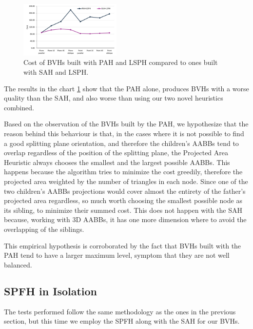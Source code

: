 \documentclass[acmtog, anonymous, review]{acmart}
\begin{document}
\begin{figure}[H]
	\centering
	\includegraphics[width=0.45\textwidth]{Images/pah_isolation.png}
	\caption{Cost of BVHs built with PAH and LSPH compared to ones built with SAH and LSPH.}
	\label{fig:pah_isolation}
\end{figure}

The results in the chart \ref{fig:pah_isolation} show that the PAH alone, produces BVHs with a worse quality than the SAH, and also worse than using our two novel heuristics combined.

Based on the observation of the BVHs built by the PAH, we hypothesize that the reason behind this behaviour is that, in the cases where it is not possible to find a good splitting plane orientation, and therefore the children's AABBs tend to overlap regardless of the position of the splitting plane, the Projected Area Heuristic always chooses the smallest and the largest possible AABBs. This happens because the algorithm tries to minimize the cost greedily, therefore the projected area weighted by the number of triangles in each node. Since one of the two children's AABBs projections would cover almost the entirety of the father's projected area regardless, so much worth choosing the smallest possible node as its sibling, to minimize their summed cost. This does not happen with the SAH because, working with 3D AABBs, it has one more dimension where to avoid the overlapping of the siblings.

This empirical hypothesis is corroborated by the fact that BVHs built with the PAH tend to have a larger maximum level, symptom that they are not well balanced.

\subsection{SPFH in Isolation} \label{ssec:spfh_iso}
The tests performed follow the same methodology as the ones in the previous section, but this time we employ the SPFH along with the SAH for our BVHs.
\end{document}
